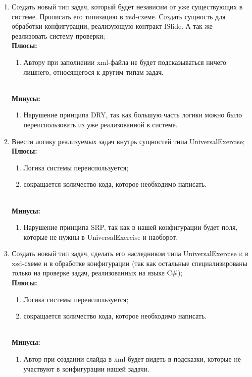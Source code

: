 \begin{enumerate}
\item Создать новый тип задач, который будет независим от уже существующих в системе. Прописать его типизацию в xsd-схеме. Создать сущность для обработки конфигурации, реализующую контракт ISlide. А так же реализовать систему проверки;
\\ \textbf{Плюсы:}
     \begin{enumerate}                  
         \item Автору при заполнении xml-файла не будет подсказываться ничего лишнего, относящегося к другим типам задач.
    \end{enumerate}
\\ \textbf{Минусы:}
    \begin{enumerate}
        \item Нарушение принципа DRY, так как большую часть логики можно было переиспользовать из уже реализованной в системе.
    \end{enumerate}
\item Внести логику реализуемых задач внутрь сущностей типа UniversalExercise;
\\ \textbf{Плюсы:}
     \begin{enumerate}                  
         \item Логика системы переиспользуется;
         \item сокращается количество кода, которое необходимо написать.
    \end{enumerate}
\\ \textbf{Минусы:}
    \begin{enumerate}
        \item Нарушение принципа SRP, так как в нашей конфигурации будет поля, которые не нужны в UniversalExercise и наоборот.
    \end{enumerate}
    
\item Создать новый тип задач, сделать его наследником типа UniversalExercise и в xsd-схеме и в обработке конфигурации (так как остальные специализированы только на проверке задач, реализованных на языке C\#);
\\ \textbf{Плюсы:}
     \begin{enumerate}                  
         \item Логика системы переиспользуется;
         \item сокращается количество кода, которое необходимо написать.
    \end{enumerate}
\\ \textbf{Минусы:}
    \begin{enumerate}
        \item Автор при создании слайда в xml будет видеть в подсказки, которые не участвуют в конфигурации нашей задачи.
    \end{enumerate}
\end{enumerate}

